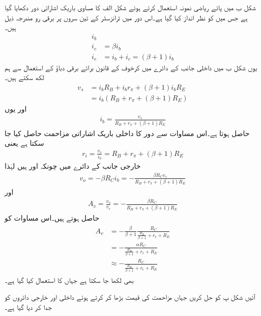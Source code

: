 شکل  ب میں پائے ریاضی نمونہ  استعمال کرتے ہوئے شکل  الف   کا مساوی باریک اشاراتی دور دکھایا گیا ہے جس میں  کو نظر انداز کیا گیا ہے۔اس دور میں ٹرانزسٹر کے تین سروں پر برقی رو مندرجہ ذیل ہیں۔
\begin{align*}
i_b &\\
i_c&=\beta i_b\\
i_e&=i_b+i_c = \left(\beta+1 \right )i_b
\end{align*}
یوں شکل  ب میں داخلی جانب کے دائرے میں کرخوف کے قانون برائے برقی دباؤ کے استعمال سے ہم لکھ سکتے ہیں۔
\begin{align*}
v_s&=i_b R_B+i_b r_{\pi} + \left(\beta+1 \right ) i_b R_E\\
&=i_b \left(R_B+r_{\pi}+\left(\beta+1 \right )R_E \right )
\end{align*}
اور یوں
\begin{align*}
i_b=\frac{v_s}{R_B+r_{\pi}+\left(\beta+1 \right )R_E}
\end{align*}
حاصل ہوتا ہے۔اس مساوات سے دور کا داخلی باریک اشاراتی مزاحمت حاصل کیا جا سکتا ہے یعنی
\begin{align*}
r_i=\frac{v_s}{i_b}=R_B+r_{\pi}+\left(\beta+1 \right )R_E
\end{align*}
خارجی جانب کے دائرے میں چونکہ  اور   ہیں لہٰذا
\begin{align*}
v_o=-\beta R_C i_b = -\frac{\beta R_C v_s}{R_B+r_{\pi}+\left(\beta+1 \right )R_E}
\end{align*}
اور 
\begin{align}
A_v=\frac{v_o}{v_s}=-\frac{\beta R_C}{R_B +r_{\pi}+\left(\beta+1 \right )R_E}
\end{align}
حاصل ہوتے ہیں۔اس مساوات کو
\begin{gather}
\begin{aligned}\label{مساوات_ٹرانزسٹر_افزائش_کی_عمومی_مساوات}
A_v&=-\frac{\beta}{\beta+1}\frac{R_C}{\frac{R_B}{\beta+1} +r_{e}+R_E}\\
&=-\frac{\alpha R_C}{\frac{R_B}{\beta+1} +r_{e}+R_E}\\
& \approx -\frac{ R_C}{\frac{R_B}{\beta+1} +r_{e}+R_E}
\end{aligned}
\end{gather}
بھی لکھا جا سکتا ہے جہاں  کا استعمال کیا گیا ہے۔

آئیں شکل  پ کو حل کریں جہاں مزاحمت کی قیمت بڑھا کر  کرتے ہوئے داخلی اور خارجی دائروں کو جدا کر دیا گیا ہے۔

